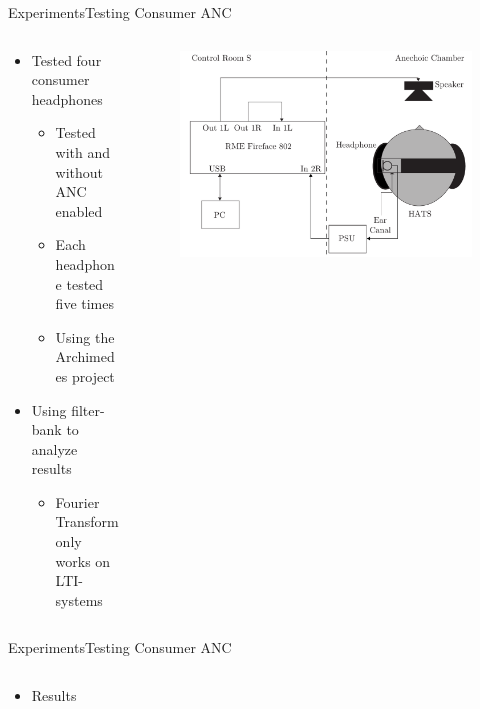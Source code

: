 \begin{frame}{Experiments}{Testing Consumer ANC}		
	\begin{columns}
		\begin{column}{0.5\textwidth}
			\begin{itemize}
				\item Tested four consumer headphones
					\begin{itemize}
						\item Tested with and without ANC enabled
						\item Each headphone tested five times
						\item Using the Archimedes project
					\end{itemize}
				\item Using filter-bank to analyze results
				\begin{itemize}
					\item Fourier Transform only works on LTI-systems
				\end{itemize}
			\end{itemize}
		\end{column}
		\begin{column}{0.5\textwidth} 				
			\begin{figure}[h]
				\includegraphics[width=1\textwidth]{figures/OtherBrandsDiagram.pdf}
			\end{figure}
		\end{column}
	\end{columns}
\end{frame}
\begin{frame}{Experiments}{Testing Consumer ANC}		
	\begin{columns}
		\begin{column}{0.2\textwidth}
			\begin{itemize}
				\item Results
			\end{itemize}
		\end{column}
		\begin{column}{0.8\textwidth} 				
			\begin{center}
				
			\end{center}
		\end{column}
	\end{columns}
\end{frame}
